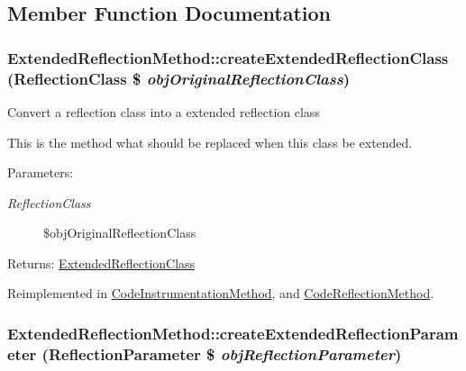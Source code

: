 \subsection{Member Function Documentation}
\hypertarget{class_extended_reflection_method_e5727cf1a1b76d84e56a5fb312989ecb}{
\subsubsection[{createExtendedReflectionClass}]{\setlength{\rightskip}{0pt plus 5cm}ExtendedReflectionMethod::createExtendedReflectionClass (ReflectionClass \$ {\em objOriginalReflectionClass})}}
\label{class_extended_reflection_method_e5727cf1a1b76d84e56a5fb312989ecb}


Convert a reflection class into a extended reflection class

This is the method what should be replaced when this class be extended.

\begin{Desc}
\item[Parameters:]
\begin{description}
\item[{\em ReflectionClass}]\$objOriginalReflectionClass \end{description}
\end{Desc}
\begin{Desc}
\item[Returns:]\hyperlink{class_extended_reflection_class}{ExtendedReflectionClass} \end{Desc}


Reimplemented in \hyperlink{class_code_instrumentation_method_7dda8c3f7ba312f14dd22d25a2b69ec1}{CodeInstrumentationMethod}, and \hyperlink{class_code_reflection_method_84c20b140478480a3bbecda5e9e13702}{CodeReflectionMethod}.\hypertarget{class_extended_reflection_method_a7d2760c2914c0ad6428171c4ca61503}{
\subsubsection[{createExtendedReflectionParameter}]{\setlength{\rightskip}{0pt plus 5cm}ExtendedReflectionMethod::createExtendedReflectionParameter (ReflectionParameter \$ {\em objReflectionParameter})}}
\label{class_extended_reflection_method_a7d2760c2914c0ad6428171c4ca61503}


